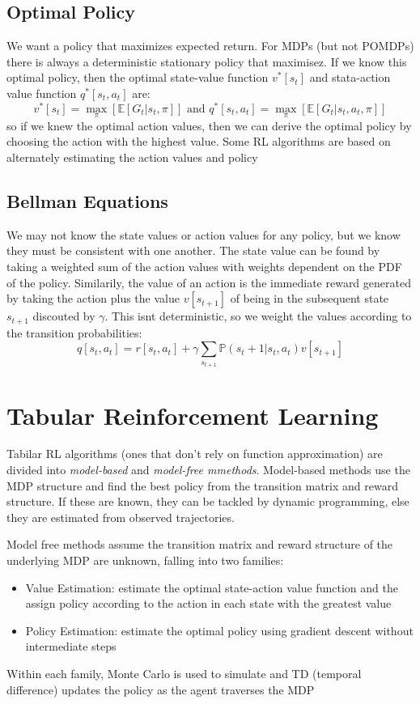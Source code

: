 \documentclass[11pt]{article}
\newcommand{\E}{\mathbb{E}}
\newcommand{\Pbb}{\mathbb{P}}
\begin{document}
\subsection{Optimal Policy}
We want a policy that maximizes expected return. For MDPs (but not POMDPs) there is always a deterministic stationary policy that maximisez. If we know this optimal policy, then the optimal state-value function $ v^* [s_t]$ and stata-action value function $ q^* [s_t, a_t]$ are:
\[v^* [s_t]=\max_\pi [\E [G_t | s_t, \pi]] \text{ and } q^* [s_t,a_t]=\max_\pi [\E [G_t | s_t,a_t, \pi]]\]
so if we knew the optimal action values, then we can derive the optimal policy by choosing the action with the highest value. Some RL algorithms are based on alternately estimating the action values and policy

\subsection{Bellman Equations}
We may not know the state values or action values for any policy, but we know they must be consistent with one another. The state value can be found by taking a weighted sum of the action values with weights dependent on the PDF of the policy. Similarily, the value of an action is the immediate reward generated by taking the action plus the value $v [s_{t+1}]$ of being in the subsequent state $s_{t+1}$ discouted by $\gamma$. This isnt deterministic, so we weight the values according to the transition probabilities:
\[q[s_t,a_t]=r[s_t,a_t]+\gamma \sum_{s_{t+1}}\Pbb (s_t+1|s_t,a_t)v[s_{t+1}]\]

\section{Tabular Reinforcement Learning}
Tabilar RL algorithms (ones that don't rely on function approximation) are divided into \emph{model-based} and \emph{model-free mmethods}. Model-based methods use the MDP structure and find the best policy from the transition matrix and reward structure. If these are known, they can be tackled by dynamic programming, else they are estimated from observed trajectories.

Model free methods assume the transition matrix and reward structure of the underlying MDP are unknown, falling into two families:
\begin{itemize}
    \item Value Estimation: estimate the optimal state-action value function and the assign policy according to the action in each state with the greatest value
    \item Policy Estimation: estimate the optimal policy using gradient descent without intermediate steps
\end{itemize}
Within each family, Monte Carlo is used to simulate and TD (temporal difference) updates the policy as the agent traverses the MDP
\end{document}
